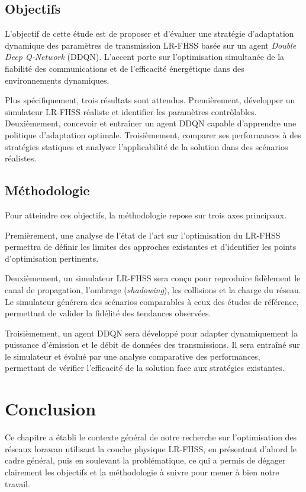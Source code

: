 \subsection{Objectifs}
L'objectif de cette étude est de proposer et d'évaluer une stratégie d'adaptation dynamique des paramètres de transmission LR-FHSS basée sur un agent \textit{Double Deep Q-Network} (DDQN). L'accent porte sur l'optimisation simultanée de la fiabilité des communications et de l'efficacité énergétique dans des environnements dynamiques.

Plus spécifiquement, trois résultats sont attendus. Premièrement, développer un simulateur LR-FHSS réaliste et identifier les paramètres contrôlables. Deuxièmement, concevoir et entraîner un agent DDQN capable d'apprendre une politique d'adaptation optimale. Troisièmement, comparer ses performances à des stratégies statiques et analyser l'applicabilité de la solution dans des scénarios réalistes.

\subsection{Méthodologie}

Pour atteindre ces objectifs, la méthodologie repose sur trois axes principaux. 

Premièrement, une analyse de l'état de l'art sur l'optimisation du LR-FHSS permettra de définir les limites des approches existantes et d'identifier les points d'optimisation pertinents. 

Deuxièmement, un simulateur LR-FHSS sera conçu pour reproduire fidèlement le canal de propagation, l'ombrage (\textit{shadowing}), les collisions et la charge du réseau. Le simulateur générera des scénarios comparables à ceux des études de référence, permettant de valider la fidélité des tendances observées. 

Troisièmement, un agent DDQN sera développé pour adapter dynamiquement la puissance d’émission et le débit de données des transmissions. Il sera entraîné sur le simulateur et évalué par une analyse comparative des performances, permettant de vérifier l'efficacité de la solution face aux stratégies existantes.

\section{Conclusion}

Ce chapitre a établi le contexte général de notre recherche sur l'optimisation des réseaux \gls{lorawan} utilisant la couche physique LR-FHSS, en présentant d'abord le cadre général, puis en soulevant la problématique, ce qui a permis de dégager clairement les objectifs et la méthodologie à suivre pour mener à bien notre travail.